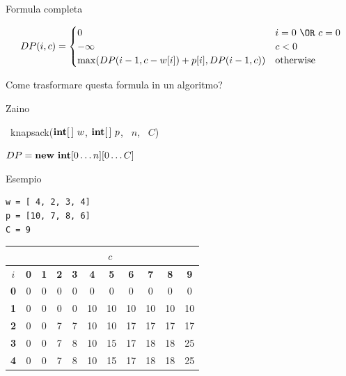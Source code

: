 \begin{frame}{Formula completa}

\begingroup
\small
\[
DP(i,c) = \begin{cases}
  0 & i=0\ \OR\ c=0 \\
  -\infty & c < 0 \\
  \max( DP(i-1,c-w[i]) + p[i], DP(i-1,c) ) & \textrm{otherwise}
\end{cases}
\]
\endgroup

Come trasformare questa formula in un algoritmo?

\end{frame}

\begin{frame}{Zaino}

\vspace{-9pt}
\begin{Procedure}
\caption[A]{\INTEGER\ \textsf{knapsack}($\INTEGER[\,]\ w$, $\INTEGER[\,]\ p$, \INTEGER\ $n$, \INTEGER\ $C$)}

$DP = \NEW\ \INTEGER[0 \ldots n][0 \ldots C]$\;
\;
\end{Procedure}

\end{frame}


\begin{frame}[fragile]{Esempio}

\begin{lstlisting}
w = [ 4, 2, 3, 4]
p = [10, 7, 8, 6]
C = 9  
\end{lstlisting}

\bigskip
\begin{tabular}{|c|c|c|c|c|c|c|c|c|c|c|}
\hline
& \multicolumn{10}{c|}{$c$} \\\hline
$i$ & \textbf{0} & \textbf{1} & \textbf{2} & \textbf{3} & \textbf{4} & \textbf{5} & \textbf{6} & \textbf{7} & \textbf{8} & \textbf{9}  \\\hline
\textbf{0} & 0 &  0 &  0 &  0 &  0 &  0 &  0 &  0 &  0 &  0 \\\hline
\textbf{1} & 0 &  0 &  0 &  0 & 10 & 10 & 10 & 10 & 10 & 10 \\\hline
\textbf{2} & 0 &  0 &  7 &  7 & 10 & 10 & 17 & 17 & 17 & 17 \\\hline
\textbf{3} & 0 &  0 &  7 &  8 & 10 & 15 & 17 & 18 & 18 & 25 \\\hline
\textbf{4} & 0 &  0 &  7 &  8 & 10 & 15 & 17 & 18 & 18 & 25 \\\hline  
\end{tabular}  

\end{frame}

